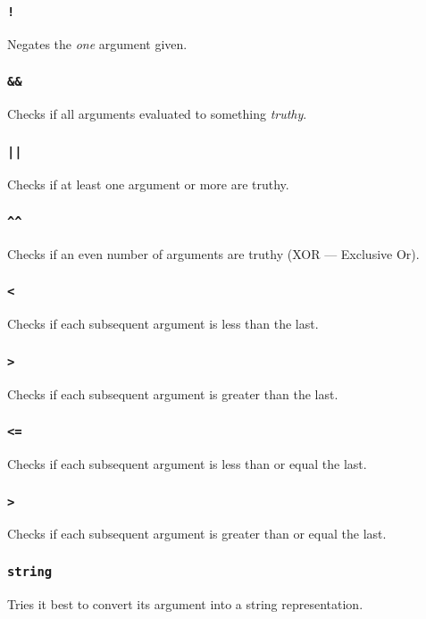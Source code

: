 \documentclass{article}
\newcommand{\code}[1]{\texttt{#1}}
\begin{document}
    \subsubsection{\code{!}}
      Negates the \emph{one} argument given.

    \subsubsection{\code{\&\&}}
       Checks if all arguments evaluated to something \emph{truthy}.

    \subsubsection{\code{||}}
      Checks if at least one argument or more are truthy.

    \subsubsection{\code{\^{}\^{}}}
      Checks if an even number of arguments are truthy (XOR --- Exclusive Or).

    \subsubsection{\code{<}}
      Checks if each subsequent argument is less than the last.

    \subsubsection{\code{>}}
      Checks if each subsequent argument is greater than the last.

    \subsubsection{\code{<=}}
      Checks if each subsequent argument is less than or equal the last.

    \subsubsection{\code{>}}
      Checks if each subsequent argument is greater than or equal the last.

    \subsubsection{\code{string}}
      Tries it best to convert its argument into a string
      representation.
\end{document}
